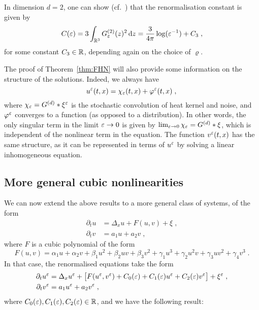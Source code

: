 \documentclass[reqno,11pt]{article}
\begin{document}
In dimension $d=2$, one can show (cf.~\cite[Rem.~2.14]{Hairer_Weber_15}) that
the
renormalisation constant is given by 
\begin{equation}
 \label{eq:FHN07}
 C(\eps) = 3\int_{\R^3}G^{(2)}_\eps(z)^2\6z = \frac{3}{4\pi} \log(\eps^{-1}) +
C_3\;,
\end{equation} 
for some constant $C_3\in\mathbb{R}$, depending again on the choice of $\varrho$. 

The proof of Theorem~\ref{thm:FHN} will also provide some information on the
structure of the solutions. Indeed, we always have 
\begin{equation}
\label{eq:FHN08} 
u^\eps(t,x) = \chi_\eps(t,x) + \varphi^\eps(t,x)\;, \\
\end{equation}
where $\chi_\varepsilon = G^{(d)}*\xi^\varepsilon$ is the stochastic convolution of heat
kernel and noise, and $\varphi^\varepsilon$ converges to a function (as opposed to a
distribution). In other words, the only singular term in the limit $\varepsilon\to0$ is
given by $\lim_{\varepsilon\to0}\chi_\varepsilon=G^{(d)}*\xi$, which is independent of the
nonlinear term in the equation. The function $v^\varepsilon(t,x)$ has the same
structure, as it can be represented in terms of $u^\varepsilon$ by solving a linear
inhomogeneous equation. 


\subsection{More general cubic nonlinearities}
\label{ssec_rcubic}

We can now extend the above results to a more general class of systems, of the
form 
\begin{align}
\nonumber
\partial_t u &= \Delta_x u + F(u,v) + \xi\;, \\
\partial_t v &= a_1 u + a_2 v\;,
\label{eq:rcubic01} 
\end{align}
where $F$ is a cubic polynomial of the form
\begin{equation}
 \label{eq:rcubic02}
  F(u,v) = \alpha_1 u + \alpha_2 v + \beta_1 u^2 + \beta_2 uv + \beta_3 v^2
 + \gamma_1 u^3 + \gamma_2 u^2 v + \gamma_3 uv^2 + \gamma_4 v^3\;.
\end{equation} 
In that case, the renormalised equations take the form 
\begin{align}
\nonumber
\partial_t u^\eps &= \Delta_x u^\eps + \bigbrak{F(u^\eps,v^\eps) +
C_0(\eps) + C_1(\eps) u^\eps + C_2(\eps) v^\eps} +
\xi^\eps\;, \\
\partial_t v^\eps &= a_1 u^\eps + a_2 v^\eps\;, 
\label{eq:rcubic03} 
\end{align}
where $C_0(\varepsilon), C_1(\varepsilon), C_2(\varepsilon) \in \mathbb{R}$, and we have the following
result:
\end{document}
